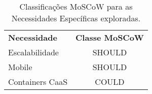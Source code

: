 \begin{table}[!h]
    \begin{center}
    \begin{tabular}{|p{}|c|}
        \hline
            \rowcolor{cldfB1} \multicolumn{2}{|c|}{\Large Necessidades Específicas \normalsize} \\ \hline \hline
            \rowcolor{lightgray}\textbf{Necessidade} & \textbf{Classe MoSCoW} \\ \hline
            \rowcolor{corSHOULD!80}Escalabilidade & SHOULD \\ \hline
            \rowcolor{corSHOULD!80}Mobile & SHOULD \\ \hline
            \rowcolor{corCOULD!50}Containers CaaS & COULD \\ \hline
    \end{tabular}    
    \caption{\label{tab:moscow:especificas} Classificações MoSCoW para as Necessidades Específicas exploradas.}
    \end{center}
\end{table}

